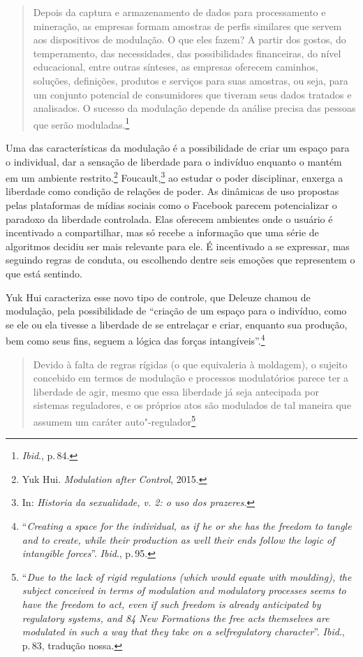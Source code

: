 \begin{quote}
Depois da captura e armazenamento de dados para processamento e
mineração, as empresas formam amostras de perfis similares que servem
aos dispositivos de modulação. O que eles fazem? A partir dos gostos, do
temperamento, das necessidades, das possibilidades financeiras, do nível
educacional, entre outras sínteses, as empresas oferecem caminhos,
soluções, definições, produtos e serviços para suas amostras, ou seja,
para um conjunto potencial de consumidores que tiveram seus dados
tratados e analisados. O sucesso da modulação depende da análise precisa
das pessoas que serão moduladas.\footnote{\textit{Ibid}., p.\,84.}
\end{quote}

Uma das características da modulação é a possibilidade de criar um
espaço para o individual, dar a sensação de liberdade para o indivíduo
enquanto o mantém em um ambiente restrito.\footnote{Yuk Hui. \emph{Modulation after Control}, 2015.}
Foucault,\footnote{In: \emph{Historia da sexualidade, v. 2: o uso dos prazeres}.} ao estudar o poder disciplinar, enxerga a liberdade como condição de
relações de poder. As dinâmicas de uso propostas pelas plataformas de
mídias sociais como o Facebook parecem potencializar o paradoxo da
liberdade controlada. Elas oferecem ambientes onde o usuário é
incentivado a compartilhar, mas só recebe a informação que uma série de
algoritmos decidiu ser mais relevante para ele. É incentivado a se
expressar, mas seguindo regras de conduta, ou escolhendo dentre seis
emoções que representem o que está sentindo.

Yuk Hui caracteriza esse novo tipo de controle, que Deleuze
chamou de modulação, pela possibilidade de ``criação de um espaço
para o indivíduo, como se ele ou ela tivesse a liberdade de se
entrelaçar e criar, enquanto sua produção, bem como seus fins, seguem a
lógica das forças intangíveis''.\footnote{``\emph{Creating a space for the
  individual, as if he or she has the freedom to tangle and to create,
  while their production as well their ends follow the logic of
  intangible forces}''. \textit{Ibid}., p.\,95.}

\begin{quote}
Devido à falta de regras rígidas (o que equivaleria à moldagem), o
sujeito concebido em termos de modulação e processos modulatórios parece
ter a liberdade de agir, mesmo que essa liberdade já seja antecipada por
sistemas reguladores, e os próprios atos são modulados de tal maneira
que assumem um caráter auto"-regulador\footnote{``\emph{Due to the lack of
  rigid regulations (which would equate with moulding), the subject
  conceived in terms of modulation and modulatory processes seems to
  have the freedom to act, even if such freedom is already anticipated
  by regulatory systems, and 84 New Formations the free acts themselves
  are modulated in such a way that they take on a selfregulatory
  character}''. \textit{Ibid}., p.\,83, tradução nossa.}
\end{quote}

